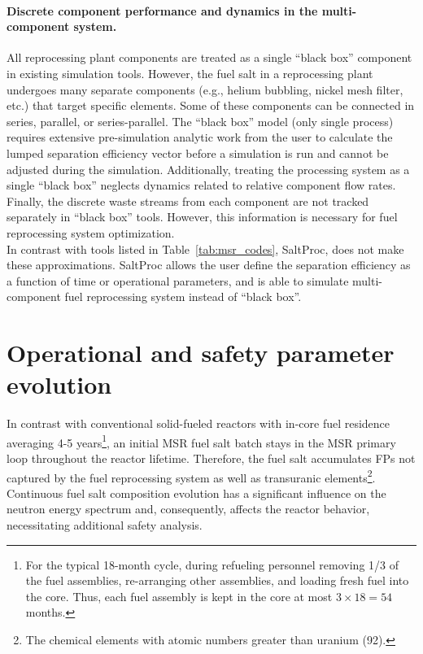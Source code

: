 \paragraph*{Discrete component performance and dynamics in the multi-component 
system.} All reprocessing plant components are treated as a single ``black 
box'' component in existing simulation tools. However, the fuel salt in a 
reprocessing plant undergoes many separate components (e.g., helium bubbling, 
nickel mesh filter, etc.) that target specific elements. Some of these 
components can be connected in series, parallel, or series-parallel. The 
``black box'' model (only single process) requires extensive pre-simulation 
analytic work from the user to calculate the lumped separation efficiency 
vector before a simulation is run and cannot be adjusted during the 
simulation. Additionally, treating the processing system as a single ``black 
box'' neglects dynamics related to relative component flow rates. Finally, the 
discrete waste streams from each component are not tracked separately in 
``black box'' tools. However, this information is necessary for fuel 
reprocessing system optimization.\\

In contrast with tools listed in Table~\ref{tab:msr_codes}, SaltProc, does not 
make these approximations. SaltProc allows the user define the separation 
efficiency as a function of time or operational parameters, and is able to 
simulate multi-component fuel reprocessing system instead of ``black box''.

\section{Operational and safety parameter evolution} 
\label{sec:saf-par-literature}
In contrast with conventional solid-fueled reactors with in-core fuel 
residence averaging 4-5 years\footnote{For the typical 18-month cycle, during 
refueling personnel removing 1/3 of the fuel assemblies, re-arranging other 
assemblies, and loading fresh fuel into the core. Thus, each fuel assembly is 
kept in the core at most $3\times 18=54$ months.}, an initial \gls{MSR} fuel 
salt batch stays in the \gls{MSR} primary loop throughout the reactor 
lifetime. 
Therefore, the fuel salt accumulates \glspl{FP} not captured by the fuel 
reprocessing system as well as transuranic elements\footnote{The chemical 
elements with atomic numbers greater than uranium (92).}. Continuous fuel 
salt composition evolution has a significant influence on the neutron energy 
spectrum and, consequently, affects the reactor behavior, necessitating 
additional safety analysis.

